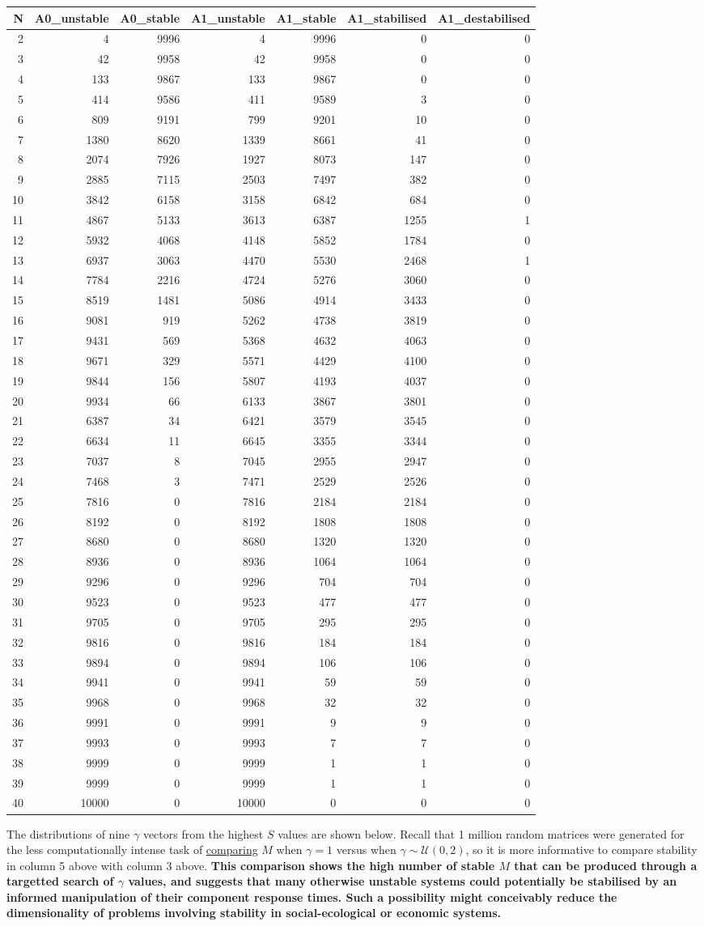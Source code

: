 \documentclass[]{article}
\begin{document}
\begin{longtable}[]{@{}rrrrrrr@{}}
\toprule
N & A0\_unstable & A0\_stable & A1\_unstable & A1\_stable &
A1\_stabilised & A1\_destabilised\tabularnewline
\midrule
\endhead
2 & 4 & 9996 & 4 & 9996 & 0 & 0\tabularnewline
3 & 42 & 9958 & 42 & 9958 & 0 & 0\tabularnewline
4 & 133 & 9867 & 133 & 9867 & 0 & 0\tabularnewline
5 & 414 & 9586 & 411 & 9589 & 3 & 0\tabularnewline
6 & 809 & 9191 & 799 & 9201 & 10 & 0\tabularnewline
7 & 1380 & 8620 & 1339 & 8661 & 41 & 0\tabularnewline
8 & 2074 & 7926 & 1927 & 8073 & 147 & 0\tabularnewline
9 & 2885 & 7115 & 2503 & 7497 & 382 & 0\tabularnewline
10 & 3842 & 6158 & 3158 & 6842 & 684 & 0\tabularnewline
11 & 4867 & 5133 & 3613 & 6387 & 1255 & 1\tabularnewline
12 & 5932 & 4068 & 4148 & 5852 & 1784 & 0\tabularnewline
13 & 6937 & 3063 & 4470 & 5530 & 2468 & 1\tabularnewline
14 & 7784 & 2216 & 4724 & 5276 & 3060 & 0\tabularnewline
15 & 8519 & 1481 & 5086 & 4914 & 3433 & 0\tabularnewline
16 & 9081 & 919 & 5262 & 4738 & 3819 & 0\tabularnewline
17 & 9431 & 569 & 5368 & 4632 & 4063 & 0\tabularnewline
18 & 9671 & 329 & 5571 & 4429 & 4100 & 0\tabularnewline
19 & 9844 & 156 & 5807 & 4193 & 4037 & 0\tabularnewline
20 & 9934 & 66 & 6133 & 3867 & 3801 & 0\tabularnewline
21 & 6387 & 34 & 6421 & 3579 & 3545 & 0\tabularnewline
22 & 6634 & 11 & 6645 & 3355 & 3344 & 0\tabularnewline
23 & 7037 & 8 & 7045 & 2955 & 2947 & 0\tabularnewline
24 & 7468 & 3 & 7471 & 2529 & 2526 & 0\tabularnewline
25 & 7816 & 0 & 7816 & 2184 & 2184 & 0\tabularnewline
26 & 8192 & 0 & 8192 & 1808 & 1808 & 0\tabularnewline
27 & 8680 & 0 & 8680 & 1320 & 1320 & 0\tabularnewline
28 & 8936 & 0 & 8936 & 1064 & 1064 & 0\tabularnewline
29 & 9296 & 0 & 9296 & 704 & 704 & 0\tabularnewline
30 & 9523 & 0 & 9523 & 477 & 477 & 0\tabularnewline
31 & 9705 & 0 & 9705 & 295 & 295 & 0\tabularnewline
32 & 9816 & 0 & 9816 & 184 & 184 & 0\tabularnewline
33 & 9894 & 0 & 9894 & 106 & 106 & 0\tabularnewline
34 & 9941 & 0 & 9941 & 59 & 59 & 0\tabularnewline
35 & 9968 & 0 & 9968 & 32 & 32 & 0\tabularnewline
36 & 9991 & 0 & 9991 & 9 & 9 & 0\tabularnewline
37 & 9993 & 0 & 9993 & 7 & 7 & 0\tabularnewline
38 & 9999 & 0 & 9999 & 1 & 1 & 0\tabularnewline
39 & 9999 & 0 & 9999 & 1 & 1 & 0\tabularnewline
40 & 10000 & 0 & 10000 & 0 & 0 & 0\tabularnewline
\bottomrule
\end{longtable}

The distributions of nine \(\gamma\) vectors from the highest \(S\)
values are shown below. Recall that 1 million random matrices were
generated for the less computationally intense task of
\protect\hyperlink{IncrS}{comparing} \(M\) when \(\gamma = 1\) versus
when \(\gamma \sim \mathcal{U}(0, 2)\), so it is more informative to
compare stability in column 5 above with column 3 above. \textbf{This
comparison shows the high number of stable \(M\) that can be produced
through a targetted search of \(\gamma\) values, and suggests that many
otherwise unstable systems could potentially be stabilised by an
informed manipulation of their component response times. Such a
possibility might conceivably reduce the dimensionality of problems
involving stability in social-ecological or economic systems.}
\end{document}
